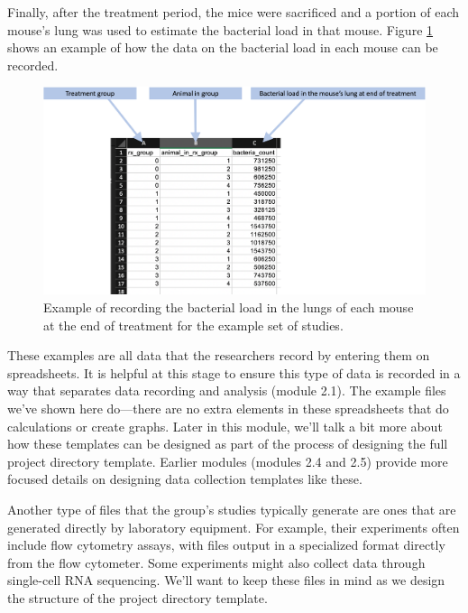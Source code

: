 \documentclass[]{tufte-book}
\begin{document}
Finally, after the treatment period, the mice were sacrificed and a portion of
each mouse's lung was used to estimate the bacterial load in that mouse. Figure
\ref{fig:bacterialload} shows an example of how the data on the bacterial load
in each mouse can be recorded.

\begin{figure}
\includegraphics[width=\textwidth]{figures/project_bacterial_load} \caption[Example of recording the bacterial load in the lungs of each mouse at the end of treatment for the example set of studies]{Example of recording the bacterial load in the lungs of each mouse at the end of treatment for the example set of studies.}\label{fig:bacterialload}
\end{figure}

These examples are all data that the researchers record by entering them on
spreadsheets. It is helpful at this stage to ensure this type of data is
recorded in a way that separates data recording and analysis (module 2.1).
The example files we've shown here do---there are no extra elements in these
spreadsheets that do calculations or create graphs. Later in this module, we'll
talk a bit more about how these templates can be designed as part of the
process of designing the full project directory template. Earlier modules
(modules 2.4 and 2.5) provide more focused details on designing data collection
templates like these.

Another type of files that the group's studies typically generate are ones
that are generated directly by laboratory equipment. For example, their
experiments often include flow cytometry assays, with files output in a
specialized format directly from the flow cytometer. Some experiments might
also collect data through single-cell RNA sequencing. We'll want to keep
these files in mind as we design the structure of the project directory
template.
\end{document}
